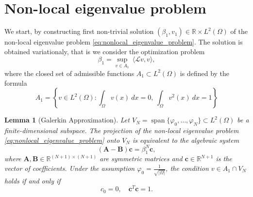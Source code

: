 \documentclass[12pt, a4paper]{article}
\theoremstyle{break}
\theoremstyle{break}
\theoremstyle{break}
\theoremstyle{break}
\theoremstyle{break}
\newtheorem{lem}{Lemma}[section]
\theoremstyle{break}
\theoremstyle{break}
\theoremstyle{break}
\theoremstyle{break}
\begin{document}
\section{Non-local eigenvalue problem}

We start, by constructing first non-trivial solution $(\beta_1, v_1) \in \mathbb{R} \times L^2(\Omega)$ of the non-local eigenvalue problem \eqref{eq:nonlocal_eigenvalue_problem}. The solution is obtained variationaly, that is we consider the optimization problem
\begin{equation}
    \label{eq:eigenvalue_problem_1}
    \beta_1 = \sup_{v \in A_1} \: \langle \mathcal L v, v \rangle,
\end{equation}
where the closed set of admissible functions $A_1 \subset L^2(\Omega)$ is defined by the formula
\begin{equation}
    \label{eq:A_set_Def}
    A_1 = \left\{ v \in L^2(\Omega) : \int_\Omega v(x) \:dx = 0, \: \int_\Omega v^2(x) \:dx = 1 \right\}
\end{equation}

\begin{lem}[Galerkin Approximation]
\label{lem:galerkin_approximation}
Let $V_N = \operatorname{span}\{\varphi_0, \dots, \varphi_N\} \subset L^2(\Omega)$ be a finite-dimensional subspace. The projection of the non-local eigenvalue problem \eqref{eq:nonlocal_eigenvalue_problem} onto $V_N$ is equivalent to the algebraic system 
\begin{equation}
    \label{eq:matrix_system_lemma}
    (\mathbf{A} - \mathbf{B})\mathbf{c} = \beta_1^N \mathbf{c},
\end{equation}
    where $\mathbf{A}, \mathbf{B} \in \mathbb{R}^{(N+1) \times (N+1)}$ are symmetric matrices and $\mathbf{c} \in \mathbb{R}^{N+1}$ is the vector of coefficients. Under the assumption $\varphi_0 = \frac{1}{\sqrt{|\Omega|}}$, the condition $v \in A_1 \cap V_N$ holds if and only if
    \begin{equation}
        \label{eq:system_constraint_lemma}
        c_0 = 0, \quad \mathbf{c}^T\mathbf{c} = 1.
    \end{equation}
\end{lem}
\end{document}
